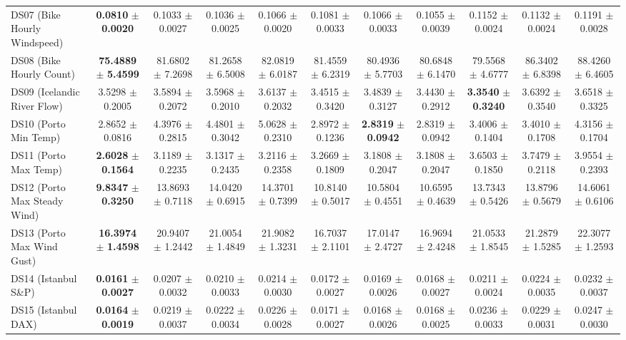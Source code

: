 \begin{table}[t]
{{\begin{tabular}{lcccccccccc}
DS07 (Bike Hourly Windspeed) & \textbf{0.0810} $\pm$ \textbf{0.0020} & 0.1033 $\pm$ 0.0027 & 0.1036 $\pm$ 0.0025 & 0.1066 $\pm$ 0.0020 & 0.1081 $\pm$ 0.0033 & 0.1066 $\pm$ 0.0033 & 0.1055 $\pm$ 0.0039 & 0.1152 $\pm$ 0.0024 & 0.1132 $\pm$ 0.0024 & 0.1191 $\pm$ 0.0028 \\
DS08 (Bike Hourly Count) & \textbf{75.4889} $\pm$ \textbf{5.4599} & 81.6802 $\pm$ 7.2698 & 81.2658 $\pm$ 6.5008 & 82.0819 $\pm$ 6.0187 & 81.4559 $\pm$ 6.2319 & 80.4936 $\pm$ 5.7703 & 80.6848 $\pm$ 6.1470 & 79.5568 $\pm$ 4.6777 & 86.3402 $\pm$ 6.8398 & 88.4260 $\pm$ 6.4605 \\
DS09 (Icelandic River Flow) & 3.5298 $\pm$ 0.2005 & 3.5894 $\pm$ 0.2072 & 3.5968 $\pm$ 0.2010 & 3.6137 $\pm$ 0.2032 & 3.4515 $\pm$ 0.3420 & 3.4839 $\pm$ 0.3127 & 3.4430 $\pm$ 0.2912 & \textbf{3.3540} $\pm$ \textbf{0.3240} & 3.6392 $\pm$ 0.3540 & 3.6518 $\pm$ 0.3325 \\
DS10 (Porto Min Temp) & 2.8652 $\pm$ 0.0816 & 4.3976 $\pm$ 0.2815 & 4.4801 $\pm$ 0.3042 & 5.0628 $\pm$ 0.2310 & 2.8972 $\pm$ 0.1236 & \textbf{2.8319} $\pm$ \textbf{0.0942} & 2.8319 $\pm$ 0.0942 & 3.4006 $\pm$ 0.1404 & 3.4010 $\pm$ 0.1708 & 4.3156 $\pm$ 0.1704 \\
DS11 (Porto Max Temp) & \textbf{2.6028} $\pm$ \textbf{0.1564} & 3.1189 $\pm$ 0.2235 & 3.1317 $\pm$ 0.2435 & 3.2116 $\pm$ 0.2358 & 3.2669 $\pm$ 0.1809 & 3.1808 $\pm$ 0.2047 & 3.1808 $\pm$ 0.2047 & 3.6503 $\pm$ 0.1850 & 3.7479 $\pm$ 0.2118 & 3.9554 $\pm$ 0.2393 \\
DS12 (Porto Max Steady Wind) & \textbf{9.8347} $\pm$ \textbf{0.3250} & 13.8693 $\pm$ 0.7118 & 14.0420 $\pm$ 0.6915 & 14.3701 $\pm$ 0.7399 & 10.8140 $\pm$ 0.5017 & 10.5804 $\pm$ 0.4551 & 10.6595 $\pm$ 0.4639 & 13.7343 $\pm$ 0.5426 & 13.8796 $\pm$ 0.5679 & 14.6061 $\pm$ 0.6106 \\
DS13 (Porto Max Wind Gust) & \textbf{16.3974} $\pm$ \textbf{1.4598} & 20.9407 $\pm$ 1.2442 & 21.0054 $\pm$ 1.4849 & 21.9082 $\pm$ 1.3231 & 16.7037 $\pm$ 2.1101 & 17.0147 $\pm$ 2.4727 & 16.9694 $\pm$ 2.4248 & 21.0533 $\pm$ 1.8545 & 21.2879 $\pm$ 1.5285 & 22.3077 $\pm$ 1.2593 \\
DS14 (Istanbul S\&P) & \textbf{0.0161} $\pm$ \textbf{0.0027} & 0.0207 $\pm$ 0.0032 & 0.0210 $\pm$ 0.0033 & 0.0214 $\pm$ 0.0030 & 0.0172 $\pm$ 0.0027 & 0.0169 $\pm$ 0.0026 & 0.0168 $\pm$ 0.0027 & 0.0211 $\pm$ 0.0024 & 0.0224 $\pm$ 0.0035 & 0.0232 $\pm$ 0.0037 \\
DS15 (Istanbul DAX) & \textbf{0.0164} $\pm$ \textbf{0.0019} & 0.0219 $\pm$ 0.0037 & 0.0222 $\pm$ 0.0034 & 0.0226 $\pm$ 0.0028 & 0.0171 $\pm$ 0.0027 & 0.0168 $\pm$ 0.0026 & 0.0168 $\pm$ 0.0025 & 0.0236 $\pm$ 0.0033 & 0.0229 $\pm$ 0.0031 & 0.0247 $\pm$ 0.0030 \\

\end{tabular}}}
\end{table}
